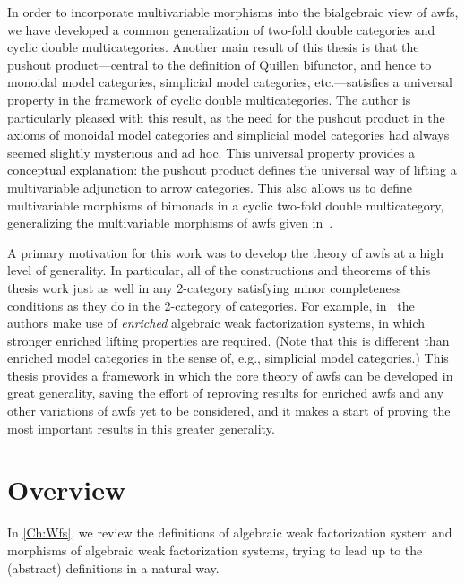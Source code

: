In order to incorporate multivariable morphisms into the bialgebraic view of awfs, we have developed a common generalization of two-fold double categories and cyclic double multicategories. Another main result of this thesis is that the pushout product---central to the definition of Quillen bifunctor, and hence to monoidal model categories, simplicial model categories, etc.---satisfies a universal property in the framework of cyclic double multicategories. The author is particularly pleased with this result, as the need for the pushout product in the axioms of monoidal model categories and simplicial model categories had always seemed slightly mysterious and ad hoc. This universal property provides a conceptual explanation: the pushout product defines the universal way of lifting a multivariable adjunction to arrow categories. This also allows us to define multivariable morphisms of bimonads in a cyclic two-fold double multicategory, generalizing the multivariable morphisms of awfs given in~\cite{riehl:nwfs-monoidal}.

A primary motivation for this work was to develop the theory of awfs at a high level of generality. In particular, all of the constructions and theorems of this thesis work just as well in any 2-category satisfying minor completeness conditions as they do in the 2-category of categories. For example, in~\cite{bmr:six} the authors make use of \emph{enriched} algebraic weak factorization systems, in which stronger enriched lifting properties are required. (Note that this is different than enriched model categories in the sense of, e.g., simplicial model categories.) This thesis provides a framework in which the core theory of awfs can be developed in great generality, saving the effort of reproving results for enriched awfs and any other variations of awfs yet to be considered, and it makes a start of proving the most important results in this greater generality.

\section*{Overview}

In \cref{Ch:Wfs}, we review the definitions of algebraic weak factorization system and morphisms of algebraic weak factorization systems, trying to lead up to the (abstract) definitions in a natural way.

